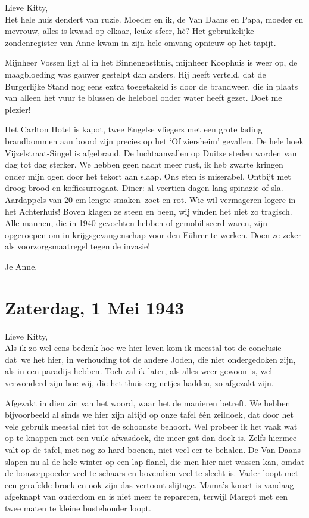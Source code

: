 \documentclass{book}
\begin{document}
Lieve Kitty,\\
Het hele huis dendert van ruzie. Moeder en ik, de Van Daans en
Papa, moeder en mevrouw, alles is kwaad op elkaar, leuke sfeer, hè? Het
gebruikelijke zondenregister van Anne kwam in zijn hele omvang opnieuw op het
tapijt.

Mijnheer Vossen ligt al in het Binnengasthuis, mijnheer Koophuis is weer op, de
maagbloeding was gauwer gestelpt dan anders. Hij heeft verteld, dat de
Burgerlijke Stand nog eens extra toegetakeld is door de brandweer, die in plaats
van alleen het vuur te blussen de heleboel onder water heeft gezet. Doet me
plezier!

Het Carlton Hotel is kapot, twee Engelse vliegers met een grote lading
brandbommen aan boord zijn precies op het `Of ziersheim' gevallen. De hele hoek
Vijzelstraat-Singel is afgebrand. De luchtaanvallen op Duitse steden worden van
dag tot dag sterker. We hebben geen nacht meer rust, ik heb zwarte kringen onder
mijn ogen door het tekort aan slaap. Ons eten is miserabel. Ontbijt met droog
brood en koffiesurrogaat. Diner: al veertien dagen lang spinazie of sla.
Aardappels van 20 cm lengte smaken~zoet en rot. Wie wil vermageren logere in het
Achterhuis! Boven klagen ze steen en been, wij vinden het niet zo tragisch. Alle
mannen, die in 1940 gevochten hebben of gemobiliseerd waren, zijn opgeroepen om
in krijgsgevangenschap voor den Führer te werken. Doen ze zeker als
voorzorgsmaatregel tegen de invasie!

Je Anne.

\section*{Zaterdag, 1 Mei 1943}

Lieve Kitty,\\
Als ik zo wel eens bedenk hoe we hier leven kom ik meestal tot de
conclusie dat~we het hier, in verhouding tot de andere Joden, die niet
ondergedoken zijn, als in een paradijs hebben. Toch zal ik later, als alles weer
gewoon is, wel verwonderd zijn hoe wij, die het thuis erg netjes hadden, zo
afgezakt zijn.

Afgezakt in dien zin van het woord, waar het de manieren betreft. We hebben
bijvoorbeeld al sinds we hier zijn altijd op onze tafel één zeildoek, dat door
het vele gebruik meestal niet tot de schoonste behoort. Wel probeer ik het vaak
wat op te knappen met een vuile afwasdoek, die meer gat dan doek is. Zelfs
hiermee valt op de tafel, met nog zo hard boenen, niet veel eer te behalen. De
Van Daans slapen nu al de hele winter op een lap flanel, die men hier niet
wassen kan, omdat de bonzeeppoeder veel te schaars en bovendien veel te slecht
is. Vader loopt met een gerafelde broek en ook zijn das vertoont slijtage.
Mama's korset is vandaag afgeknapt van ouderdom en is niet meer te repareren,
terwijl Margot met een twee maten te kleine bustehouder loopt.
\end{document}
